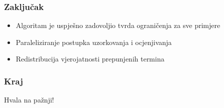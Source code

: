 \documentclass{beamer}
\begin{document}
\begin{frame}
  \frametitle{Zaključak}
  \begin{itemize}
    \item Algoritam je uspješno zadovoljio tvrda ograničenja za sve primjere
    \item Paraleliziranje postupka uzorkovanja i ocjenjivanja
    \item Redistribucija vjerojatnosti prepunjenih termina
  \end{itemize}
\end{frame}

\begin{frame}
  \frametitle{Kraj}
  \centering
  \large
    Hvala na pažnji!
\end{frame}
\end{document}
